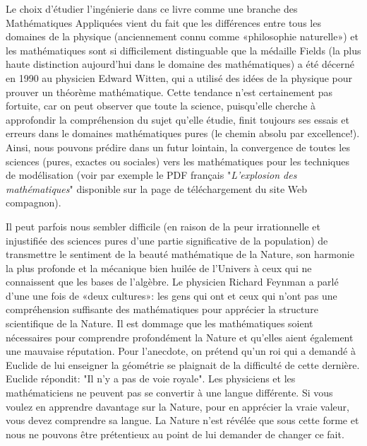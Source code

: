 	Le choix d'\'etudier l'ing\'enierie dans ce livre comme une branche des Math\'ematiques Appliqu\'ees vient du fait que les diff\'erences entre tous les domaines de la physique (anciennement connu comme «philosophie naturelle») et les math\'ematiques sont si difficilement distinguable que la m\'edaille Fields (la plus haute distinction aujourd'hui dans le domaine des math\'ematiques) a \'et\'e d\'ecern\'e en 1990 au physicien Edward Witten, qui a utilis\'e des id\'ees de la physique pour prouver un th\'eorème math\'ematique. Cette tendance n'est certainement pas fortuite, car on peut observer que toute la science, puisqu'elle cherche à approfondir la compr\'ehension du sujet qu'elle \'etudie, finit toujours ses essais et erreurs dans le domaines math\'ematiques pures (le chemin absolu par excellence!). Ainsi, nous pouvons pr\'edire dans un futur lointain, la convergence de toutes les sciences (pures, exactes ou sociales) vers les math\'ematiques pour les techniques de mod\'elisation (voir par exemple le PDF français "\textit{L'explosion des math\'ematiques}" disponible sur la page de t\'el\'echargement du site Web compagnon).

	Il peut parfois nous sembler difficile (en raison de la peur irrationnelle et injustifi\'ee des sciences pures d'une partie significative de la population) de transmettre le sentiment de la beaut\'e math\'ematique de la Nature, son harmonie la plus profonde et la m\'ecanique bien huil\'ee de l'Univers à ceux qui ne connaissent que les bases de l'algèbre. Le physicien Richard Feynman a parl\'e d'une une fois de «deux cultures»: les gens qui ont et ceux qui n'ont pas une compr\'ehension suffisante des math\'ematiques pour appr\'ecier la structure scientifique de la Nature. Il est dommage que les math\'ematiques soient n\'ecessaires pour comprendre profond\'ement la Nature et qu'elles aient \'egalement une mauvaise r\'eputation. Pour l'anecdote, on pr\'etend qu'un roi qui a demand\'e à Euclide de lui enseigner la g\'eom\'etrie se plaignait de la difficult\'e de cette dernière. Euclide r\'epondit: "Il n'y a pas de voie royale". Les physiciens et les math\'ematiciens ne peuvent pas se convertir à une langue diff\'erente. Si vous voulez en apprendre davantage sur la Nature, pour en appr\'ecier la vraie valeur, vous devez comprendre sa langue. La Nature n'est r\'ev\'el\'ee que sous cette forme et nous ne pouvons être pr\'etentieux au point de lui demander de changer ce fait.
	
